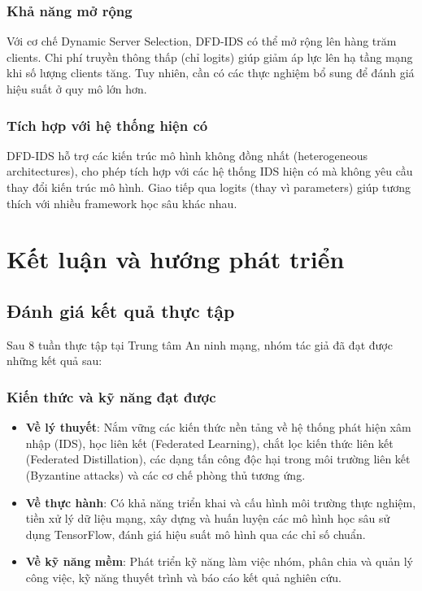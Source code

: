 \subsection{Khả năng mở rộng}
Với cơ chế Dynamic Server Selection, DFD-IDS có thể mở rộng lên hàng trăm clients. Chi phí truyền thông thấp (chỉ logits) giúp giảm áp lực lên hạ tầng mạng khi số lượng clients tăng. Tuy nhiên, cần có các thực nghiệm bổ sung để đánh giá hiệu suất ở quy mô lớn hơn.

\subsection{Tích hợp với hệ thống hiện có}
DFD-IDS hỗ trợ các kiến trúc mô hình không đồng nhất (heterogeneous architectures), cho phép tích hợp với các hệ thống IDS hiện có mà không yêu cầu thay đổi kiến trúc mô hình. Giao tiếp qua logits (thay vì parameters) giúp tương thích với nhiều framework học sâu khác nhau.

\pagebreak

\chapter{Kết luận và hướng phát triển}

\section{Đánh giá kết quả thực tập}
\label{sec:assessment}

Sau 8 tuần thực tập tại Trung tâm An ninh mạng, nhóm tác giả đã đạt được những kết quả sau:

\subsection{Kiến thức và kỹ năng đạt được}
\begin{itemize}
    \item \textbf{Về lý thuyết}: Nắm vững các kiến thức nền tảng về hệ thống phát hiện xâm nhập (IDS), học liên kết (Federated Learning), chắt lọc kiến thức liên kết (Federated Distillation), các dạng tấn công độc hại trong môi trường liên kết (Byzantine attacks) và các cơ chế phòng thủ tương ứng.
    \item \textbf{Về thực hành}: Có khả năng triển khai và cấu hình môi trường thực nghiệm, tiền xử lý dữ liệu mạng, xây dựng và huấn luyện các mô hình học sâu sử dụng TensorFlow, đánh giá hiệu suất mô hình qua các chỉ số chuẩn.
    \item \textbf{Về kỹ năng mềm}: Phát triển kỹ năng làm việc nhóm, phân chia và quản lý công việc, kỹ năng thuyết trình và báo cáo kết quả nghiên cứu.
\end{itemize}


